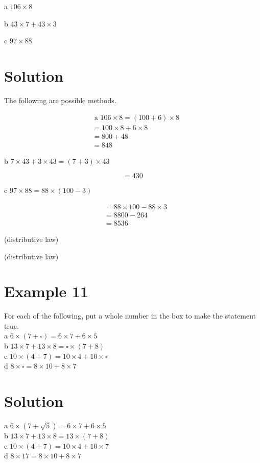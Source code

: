 \documentclass[10pt]{article}
\begin{document}
a \(106 \times 8\)

b \(43 \times 7+43 \times 3\)

c \(97 \times 88\)

\section*{Solution}
The following are possible methods.

\[
\begin{aligned}
& \text { a } 106 \times 8=(100+6) \times 8 \\
& =100 \times 8+6 \times 8 \\
& =800+48 \\
& =848
\end{aligned}
\]

b \(7 \times 43+3 \times 43=(7+3) \times 43\)

\[
=430
\]

c \(97 \times 88=88 \times(100-3)\)

\[
\begin{aligned}
& =88 \times 100-88 \times 3 \\
& =8800-264 \\
& =8536
\end{aligned}
\]

(distributive law)

(distributive law)

\section*{Example 11}
For each of the following, put a whole number in the box to make the statement true.\\
a \(6 \times(7+\square)=6 \times 7+6 \times 5\)\\
b \(13 \times 7+13 \times 8=\square \times(7+8)\)\\
c \(10 \times(4+7)=10 \times 4+10 \times \square\)\\
d \(8 \times \square=8 \times 10+8 \times 7\)

\section*{Solution}
a \(6 \times(7+\sqrt{5})=6 \times 7+6 \times 5\)\\
b \(13 \times 7+13 \times 8=13 \times(7+8)\)\\
c \(10 \times(4+7)=10 \times 4+10 \times 7\)\\
d \(8 \times 17=8 \times 10+8 \times 7\)
\end{document}
